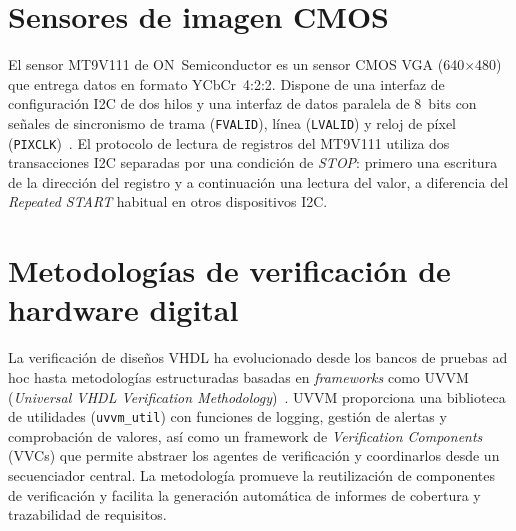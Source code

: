 \documentclass[../main.tex]{subfiles}
\begin{document}
\section{Sensores de imagen CMOS}

El sensor MT9V111 de ON~Semiconductor es un sensor CMOS VGA (640$\times$480) que entrega datos en formato YCbCr~4:2:2. Dispone de una interfaz de configuración I2C de dos hilos y una interfaz de datos paralela de 8~bits con señales de sincronismo de trama (\texttt{FVALID}), línea (\texttt{LVALID}) y reloj de píxel (\texttt{PIXCLK})~\cite{mt9v111_datasheet}. El protocolo de lectura de registros del MT9V111 utiliza dos transacciones I2C separadas por una condición de \textit{STOP}: primero una escritura de la dirección del registro y a continuación una lectura del valor, a diferencia del \textit{Repeated START} habitual en otros dispositivos I2C.

\section{Metodologías de verificación de hardware digital}

La verificación de diseños VHDL ha evolucionado desde los bancos de pruebas ad hoc hasta metodologías estructuradas basadas en \textit{frameworks} como UVVM (\textit{Universal VHDL Verification Methodology})~\cite{uvvm}. UVVM proporciona una biblioteca de utilidades (\texttt{uvvm\_util}) con funciones de logging, gestión de alertas y comprobación de valores, así como un framework de \textit{Verification Components} (VVCs) que permite abstraer los agentes de verificación y coordinarlos desde un secuenciador central. La metodología promueve la reutilización de componentes de verificación y facilita la generación automática de informes de cobertura y trazabilidad de requisitos.
\end{document}
